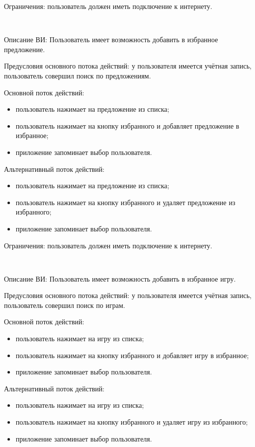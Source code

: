 Ограничения: пользователь должен иметь подключение к интернету.

~\par
\label{use:favoritedeals}
Описание ВИ: Пользователь имеет возможность добавить в избранное предложение.
 
Предусловия основного потока действий: у пользователя имеется учётная запись, пользователь совершил поиск по предложениям.
 
Основной поток действий:
\begin{itemize}
   \item пользователь нажимает на предложение из списка;
   \item пользователь нажимает на кнопку избранного и добавляет предложение в избранное;
   \item приложение запоминает выбор пользователя.
\end{itemize}

Альтернативный поток действий:
\begin{itemize}
   \item пользователь нажимает на предложение из списка;
   \item пользователь нажимает на кнопку избранного и удаляет предложение из избранного;
   \item приложение запоминает выбор пользователя.
\end{itemize}

Ограничения: пользователь должен иметь подключение к интернету.

~\par
\label{use:favoritegames}
Описание ВИ: Пользователь имеет возможность добавить в избранное игру.
 
Предусловия основного потока действий: у пользователя имеется учётная запись, пользователь совершил поиск по играм.
 
Основной поток действий:
\begin{itemize}
   \item пользователь нажимает на игру из списка;
   \item пользователь нажимает на кнопку избранного и добавляет игру в избранное;
   \item приложение запоминает выбор пользователя.
\end{itemize}

Альтернативный поток действий:
\begin{itemize}
   \item пользователь нажимает на игру из списка;
   \item пользователь нажимает на кнопку избранного и удаляет игру из избранного;
   \item приложение запоминает выбор пользователя.
\end{itemize}


